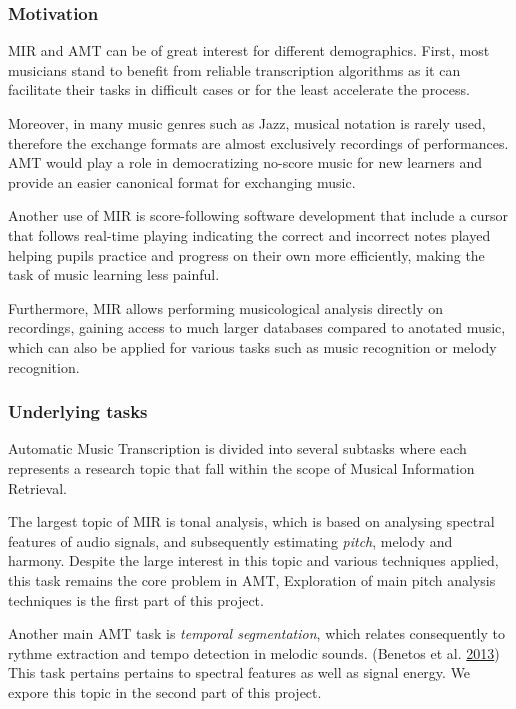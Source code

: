 \documentclass[
  american,
]{article}
\begin{document}
\hypertarget{motivation}{%
\subsubsection{Motivation}\label{motivation}}

MIR and AMT can be of great interest for different demographics.
First, most musicians stand to benefit from reliable
transcription algorithms as it can facilitate their tasks in
difficult cases or for the least accelerate the process.

Moreover, in many music genres such as Jazz, musical
notation is rarely used, therefore the exchange formats
are almost exclusively recordings of performances.
AMT would play a role in democratizing no-score music
for new learners and provide an easier canonical
format for exchanging music.

Another use of MIR is score-following software development
that include a cursor that follows real-time playing
indicating the correct and incorrect notes played
helping pupils practice and progress on their
own more efficiently, making the task of music learning
less painful.

Furthermore, MIR allows performing musicological analysis
directly on recordings, gaining access to much larger
databases compared to anotated music, which can also
be applied for various tasks such as music recognition
or melody recognition.

\hypertarget{underlying-tasks}{%
\subsubsection{Underlying tasks}\label{underlying-tasks}}

Automatic Music Transcription is divided into several subtasks
where each represents a research topic that fall
within the scope of Musical Information Retrieval.

The largest topic of MIR is tonal analysis, which
is based on analysing spectral features of audio signals,
and subsequently estimating \emph{pitch}, melody and harmony.
Despite the large interest in this topic and various
techniques applied, this task remains the core problem in AMT,
Exploration of main pitch analysis techniques is the
first part of this project.

Another main AMT task is \emph{temporal segmentation},
which relates consequently to rythme extraction and tempo
detection in melodic sounds. (Benetos et al. \protect\hyperlink{ref-benetos_2013}{2013})
This task pertains pertains to spectral features
as well as signal energy.
We expore this topic in the second part of this project.
\end{document}
